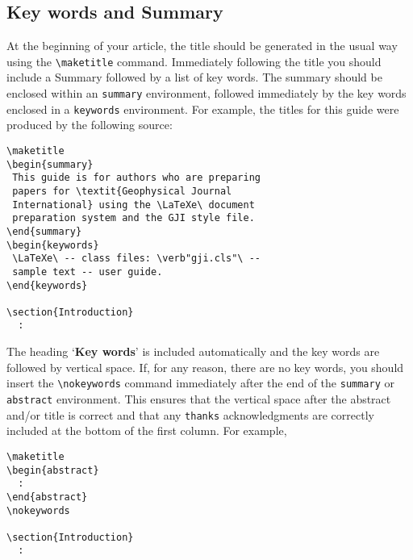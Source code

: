 \subsection{Key words and Summary}

At the beginning of your article, the title should be generated in the
usual way using the \verb"\maketitle" command. Immediately following
the title you should include a Summary followed by a list of key
words. The summary should be enclosed within an \verb"summary"
environment, followed immediately by the key words enclosed in a
\verb"keywords" environment. For example, the titles for this guide
were produced by the following source:
\begin{verbatim}
\maketitle
\begin{summary}
 This guide is for authors who are preparing
 papers for \textit{Geophysical Journal
 International} using the \LaTeXe\ document
 preparation system and the GJI style file.
\end{summary}
\begin{keywords}
 \LaTeXe\ -- class files: \verb"gji.cls"\ --
 sample text -- user guide.
\end{keywords}

\section{Introduction}
  :
\end{verbatim}
The heading `\textbf{Key words}' is included automatically and the key words are
followed by vertical space. If, for any reason, there are no key words, you
should insert the \verb"\nokeywords" command immediately after the end of the
\verb"summary" or \verb"abstract" environment. This ensures that the vertical
space after the abstract and/or title is correct and that any \verb"thanks"
acknowledgments are correctly included at the bottom of the first column. For
example,
\begin{verbatim}
\maketitle
\begin{abstract}
  :
\end{abstract}
\nokeywords

\section{Introduction}
  :
\end{verbatim}

